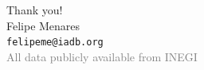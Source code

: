 \documentclass[aspectratio=169,usenames,dvipsnames]{beamer}
\begin{document}
\begin{frame}
\begin{center}
\Huge{\color{Blue}Thank you!} \\[12pt]
\small{
  Felipe Menares \\
  \texttt{felipeme@iadb.org} \\[8pt]
  \textcolor{gray}{All data publicly available from INEGI}
}
\end{center}
\end{frame}

{\tiny}

\end{document}
